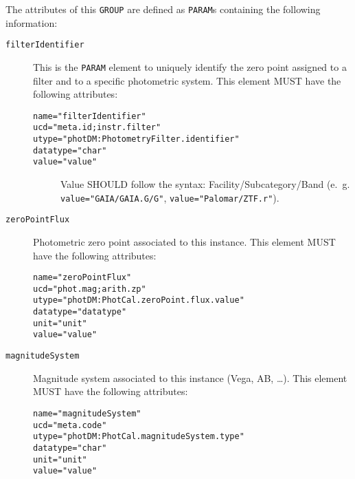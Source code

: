 \documentclass[11pt,a4paper]{ivoa}
\let\fg=\color
\def\elem#1{{\tt{\fg{DarkRed}#1}}}
\def\attrval#1#2{{\tt{\fg{DarkRed}#1}="{\fg{DarkPurple}#2}"}}
\begin{document}
The attributes of this \elem{GROUP} are defined as \elem{PARAM}s containing the following information: 
\begin{description}
\item[\elem{filterIdentifier}] This is the \elem{PARAM} element to uniquely identify the zero point assigned to a filter and to a specific photometric system. This element MUST have the following attributes:
\begin{description}
    \item[\attrval{name}{filterIdentifier}]
    \item[\attrval{ucd}{meta.id;instr.filter}]
    \item[\attrval{utype}{photDM:PhotometryFilter.identifier}]
    \item[\attrval{datatype}{char}]
    \item[\attrval{value}{value}] Value SHOULD follow the syntax: Facility/Subcategory/Band (e.~g. \attrval{value}{GAIA/GAIA.G/G}, \attrval{value}{Palomar/ZTF.r}). 
\end{description}
\item[\elem{zeroPointFlux}] Photometric zero point associated to this instance. This element MUST have the following attributes:
\begin{description}
    \item[\attrval{name}{zeroPointFlux}]
    \item[\attrval{ucd}{phot.mag;arith.zp}]
    \item[\attrval{utype}{photDM:PhotCal.zeroPoint.flux.value}]
    \item[\attrval{datatype}{datatype}]
    \item[\attrval{unit}{unit}]
    \item[\attrval{value}{value}]
\end{description}
\item[\elem{magnitudeSystem}] Magnitude system associated to this instance (Vega, AB, \dots). This element MUST have the following attributes:
\begin{description}
    \item[\attrval{name}{magnitudeSystem}]
    \item[\attrval{ucd}{meta.code}] 
    \item[\attrval{utype}{photDM:PhotCal.magnitudeSystem.type}]
    \item[\attrval{datatype}{char}]
    \item[\attrval{unit}{unit}]
    \item[\attrval{value}{value}]
\end{description}

\end{description}
\end{document}
